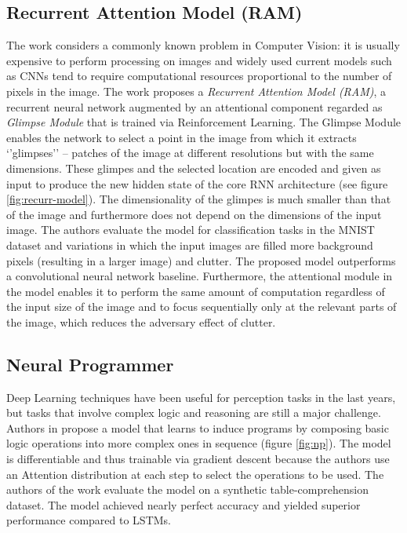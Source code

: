 \documentclass[English]{style/ic-tese-v3}
\begin{document}
\subsection{Recurrent Attention Model (RAM)}
The work \cite{ref:rec-models} considers a commonly known problem in Computer Vision: it is usually
expensive to perform processing on images and widely used current models such as
CNNs tend to require computational resources proportional to the number of pixels in the image.
The work proposes a \emph{Recurrent Attention Model (RAM)}, a recurrent neural network augmented by
an attentional component regarded as \emph{Glimpse Module} that is trained via Reinforcement Learning.
The Glimpse Module enables the network to select a point in the image from which it extracts `'glimpses''
-- patches of the image at different resolutions but with the same dimensions.
These glimpes and the selected location are encoded and given as input to produce
the new hidden state of the core RNN architecture (see figure \ref{fig:recurr-model}).
The dimensionality of the glimpes is much smaller than that of the image and furthermore does not depend
on the dimensions of the input image.
The authors evaluate the model for classification tasks in the MNIST~\cite{ref:mnist} dataset and variations
in which the input images are filled more background pixels (resulting in a larger image) and clutter.
The proposed model outperforms a convolutional neural network baseline.
Furthermore, the attentional module in the model enables it to perform the same amount of computation
regardless of the input size of the image and to focus sequentially only at the relevant parts of the image,
which reduces the adversary effect of clutter.

\subsection{Neural Programmer}
Deep Learning techniques have been useful for perception tasks in the last years, but tasks that involve
complex logic and reasoning are still a major challenge.
Authors in \cite{ref:np} propose a model that learns to induce programs by composing basic logic operations
into more complex ones in sequence (figure \ref{fig:np}).
The model is differentiable and thus trainable via gradient descent because the authors use an Attention
distribution at each step to select the operations to be used.
The authors of the work evaluate the model on a synthetic table-comprehension dataset.
The model achieved nearly perfect accuracy and yielded superior performance compared to LSTMs.
\end{document}
